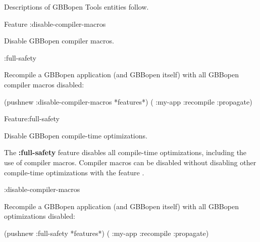 \documentclass[10pt,twoside,english,pdftex]{article}
\begin{document}
\W\entities
\T{}
\T Descriptions of GBBopen Tools entities follow.
\T\clearpage
\T\renewcommand{\headrulewidth}{0.01pt}


\begin{functiondoc}{Feature}%
  {:disable-compiler-macros}{}%
%
%
%

\fnsyntax

\fnpurpose Disable GBBopen compiler macros.

\begin{alsos}{:full-safety}
\also[defcm]
\end{alsos}

\fnexample
{}%
%
%
Recompile a GBBopen application (and GBBopen itself) with all GBBopen
compiler macros disabled:
%
\W\supp
\begin{example}
  (pushnew :disable-compiler-macros *features*)
  ( :my-app :recompile :propagate)
\end{example}

\end{functiondoc}


\begin{functiondoc}{Feature}{:full-safety}{}%
%
%
%

\fnsyntax

\fnpurpose Disable GBBopen compile-time optimizations.

\fndescription
%
The \textbf{:full-safety} feature disables all compile-time optimizations,
including the use of compiler macros.  Compiler macros can be disabled without
disabling other compile-time optimizations with the feature
.

\begin{alsos}{:disable-compiler-macros}
\also[defcm]
\end{alsos}

\fnexample
{}%
%
%
Recompile a GBBopen application (and GBBopen itself) with all GBBopen
optimizations disabled:
%
\W\supp
\begin{example}
  (pushnew :full-safety *features*)
  ( :my-app :recompile :propagate)
\end{example}

\end{functiondoc}
\end{document}
